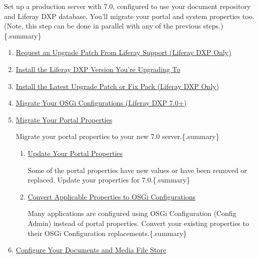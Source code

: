 \begin{enumerate}
  Set up a production server with 7.0, configured to use your document
  repository and Liferay DXP database. You'll migrate your portal and
  system properties too. (Note, this step can be done in parallel with
  any of the previous steps.)\{.summary\}

  \begin{enumerate}
  \def\labelenumii{\arabic{enumii}.}
  \item
    \href{/docs/7-2/deploy/-/knowledge_base/d/preparing-to-upgrade-the-product-database\#synchronize-a-complete-backup}{Request
    an Upgrade Patch From Liferay Support (Liferay DXP Only)}
  \item
    \href{/docs/7-2/deploy/-/knowledge_base/d/preparing-a-new-product-server-for-data-upgrade\#install-liferay}{Install
    the Liferay DXP Version You're Upgrading To}
  \item
    \href{/docs/7-2/deploy/-/knowledge_base/d/preparing-a-new-product-server-for-data-upgrade\#install-the-latest-upgrade-patch-or-fix-pack-liferay-dxp-only}{Install
    the Latest Upgrade Patch or Fix Pack (Liferay DXP Only)}
  \item
    \href{/docs/7-2/deploy/-/knowledge_base/d/preparing-a-new-product-server-for-data-upgrade\#migrate-your-osgi-configurations-70}{Migrate
    Your OSGi Configurations (Liferay DXP 7.0+)}
  \item
    \href{/docs/7-2/deploy/-/knowledge_base/d/preparing-a-new-product-server-for-data-upgrade\#migrate-your-portal-properties}{Migrate
    Your Portal Properties}

    Migrate your portal properties to your new 7.0 server.\{.summary\}

    \begin{enumerate}
    \def\labelenumiii{\arabic{enumiii}.}
    \item
      \href{/docs/7-2/deploy/-/knowledge_base/d/preparing-a-new-product-server-for-data-upgrade\#update-your-portal-properties}{Update
      Your Portal Properties}

      Some of the portal properties have new values or have been removed
      or replaced. Update your properties for 7.0.\{.summary\}
    \item
      \href{/docs/7-2/deploy/-/knowledge_base/d/preparing-a-new-product-server-for-data-upgrade\#convert-applicable-properties-to-osgi-configurations}{Convert
      Applicable Properties to OSGi Configurations}

      Many applications are configured using OSGi Configuration (Config
      Admin) instead of portal properties. Convert your existing
      properties to their OSGi Configuration replacements.\{.summary\}
    \end{enumerate}
  \item
    \href{/docs/7-2/deploy/-/knowledge_base/d/preparing-a-new-product-server-for-data-upgrade\#configure-your-documents-and-media-file-store}{Configure
    Your Documents and Media File Store}


\end{enumerate}
\end{enumerate}
